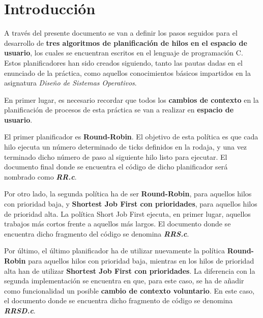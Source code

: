 \documentclass[10pt, spanish, pdftex]{template/UC3M_document}
\author{Lucía Ruz}         %
\begin{document}
\titleMain

\begin{spacing}{0.5}
    \hypersetup{linkcolor=black}    %
    \tableofcontents        %
    \vspace{0.5cm}
    \listoffigures          %
    \vspace{0.5cm}
    \listoftables\newpage           %
\end{spacing}


\section{Introducción}
A través del presente documento se van a definir los pasos seguidos para el desarrollo de \textbf{tres algoritmos de planificación de hilos en el espacio de usuario}, los cuales se encuentran escritos en el lenguaje de programación C. Estos planificadores han sido creados siguiendo, tanto las pautas dadas en el enunciado de la práctica, como aquellos conocimientos básicos impartidos en la asignatura \textit{Diseño de Sistemas Operativos}.

En primer lugar, es necesario recordar que todos los \textbf{cambios de contexto} en la planificación de procesos de esta práctica se van a realizar en \textbf{espacio de usuario}.

El primer planificador es \textbf{Round-Robin}. El objetivo de esta política es que cada hilo ejecuta un número determinado de ticks definidos en la rodaja, y una vez terminado dicho número de paso al siguiente hilo listo para ejecutar. El documento final donde se encuentra el código de dicho planificador será nombrado como \textbf{\textit{RR.c}}.

Por otro lado, la segunda política ha de ser \textbf{Round-Robin}, para aquellos hilos con prioridad baja, y \textbf{Shortest Job First con prioridades}, para aquellos hilos de prioridad alta. La política Short Job First ejecuta, en primer lugar, aquellos trabajos más cortos frente a aquellos más largos. El documento donde se encuentra dicho fragmento del código se denomina \textbf{\textit{RRS.c}}.

Por último, el último planificador ha de utilizar nuevamente la política \textbf{Round-Robin} para aquellos hilos con prioridad baja, mientras en los hilos de prioridad alta han de utilizar \textbf{Shortest Job First con prioridades}. La diferencia con la segunda implementación se encuentra en que, para este caso, se ha de añadir como funcionalidad un posible \textbf{cambio de contexto voluntario}. En este caso, el documento donde se encuentra dicho fragmento de código se denomina \textbf{\textit{RRSD.c}}.
\end{document}
